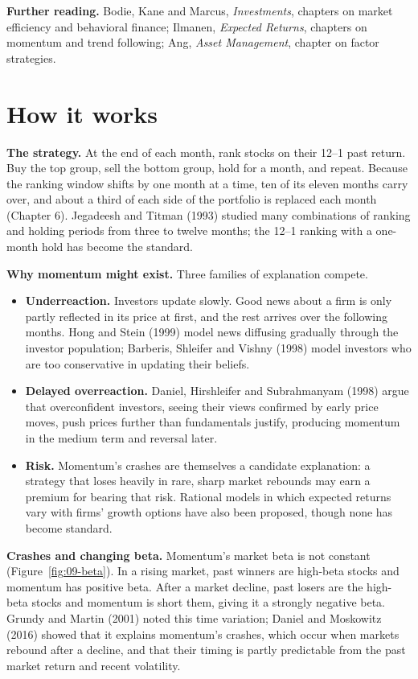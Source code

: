 \textbf{Further reading.} Bodie, Kane and Marcus, \emph{Investments}, chapters on market efficiency and behavioral finance; Ilmanen, \emph{Expected Returns}, chapters on momentum and trend following; Ang, \emph{Asset Management}, chapter on factor strategies.

\section{How it works}
\label{sec:09-how}

\textbf{The strategy.} At the end of each month, rank stocks on their 12--1 past return. Buy the top group, sell the bottom group, hold for a month, and repeat. Because the ranking window shifts by one month at a time, ten of its eleven months carry over, and about a third of each side of the portfolio is replaced each month (Chapter 6). Jegadeesh and Titman (1993) studied many combinations of ranking and holding periods from three to twelve months; the 12--1 ranking with a one-month hold has become the standard.

\textbf{Why momentum might exist.} Three families of explanation compete.

\begin{itemize}
  \item \textbf{Underreaction.} Investors update slowly. Good news about a firm is only partly reflected in its price at first, and the rest arrives over the following months. Hong and Stein (1999) model news diffusing gradually through the investor population; Barberis, Shleifer and Vishny (1998) model investors who are too conservative in updating their beliefs.
  \item \textbf{Delayed overreaction.} Daniel, Hirshleifer and Subrahmanyam (1998) argue that overconfident investors, seeing their views confirmed by early price moves, push prices further than fundamentals justify, producing momentum in the medium term and reversal later.
  \item \textbf{Risk.} Momentum's crashes are themselves a candidate explanation: a strategy that loses heavily in rare, sharp market rebounds may earn a premium for bearing that risk. Rational models in which expected returns vary with firms' growth options have also been proposed, though none has become standard.
\end{itemize}

\textbf{Crashes and changing beta.} Momentum's market beta is not constant (Figure~\ref{fig:09-beta}). In a rising market, past winners are high-beta stocks and momentum has positive beta. After a market decline, past losers are the high-beta stocks and momentum is short them, giving it a strongly negative beta. Grundy and Martin (2001) noted this time variation; Daniel and Moskowitz (2016) showed that it explains momentum's crashes, which occur when markets rebound after a decline, and that their timing is partly predictable from the past market return and recent volatility.

